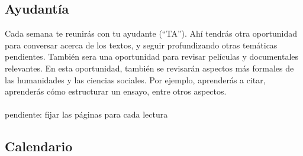 \documentclass[letterpaper]{article}
\begin{document}
\subsection*{Ayudant\'ia}

Cada semana te reunir\'as con tu ayudante (``TA''). Ah\'i tendr\'as otra oportunidad para conversar acerca de los textos, y seguir profundizando otras tem\'aticas pendientes. Tambi\'en sera una oportunidad para revisar pel\'iculas y documentales relevantes. En esta oportunidad, tambi\'en se revisar\'an aspectos m\'as formales de las humanidades y las ciencias sociales. Por ejemplo, aprender\'as a citar, aprender\'as c\'omo estructurar un ensayo, entre otros aspectos.
\\
\\
{\color{red}pendiente: fijar las p\'aginas para cada lectura}


\subsection*{Calendario}
\end{document}
